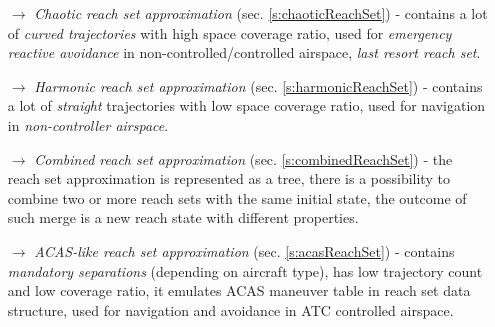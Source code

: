 \begin{itemize}
    \item[$\to$] \emph{Chaotic reach set approximation} (sec. \ref{s:chaoticReachSet}) - contains a lot of \emph{curved trajectories} with high space coverage ratio, used for \emph{emergency reactive avoidance} in non-controlled/controlled airspace, \emph{last resort reach set}.
    
    \item[$\to$] \emph{Harmonic reach set approximation} (sec. \ref{s:harmonicReachSet}) -  contains a lot of \emph{straight} trajectories with low space coverage ratio, used for navigation in \emph{non-controller airspace}.
    
    \item[$\to$] \emph{Combined reach set approximation} (sec. \ref{s:combinedReachSet}) - the reach set approximation is represented as a tree, there is a possibility to combine two or more reach sets with the same initial state, the outcome of such merge is a new reach state with different properties.
    
    \item[$\to$] \emph{ACAS-like reach set approximation} (sec. \ref{s:acasReachSet}) - contains \emph{mandatory separations} (depending on aircraft type), has low trajectory count and low coverage ratio, it emulates ACAS maneuver table in reach set data structure, used for navigation and avoidance in ATC controlled airspace.
\end{itemize}
